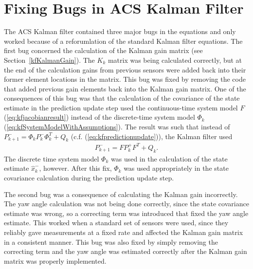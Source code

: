 \section{Fixing Bugs in ACS Kalman Filter}%
\label{sec:kfBugs}
The ACS Kalman filter contained three major bugs in the equations and only worked because of a reforumlation of the standard Kalman filter equations.
The first bug concerned the calculation of the Kalman gain matrix (see Section~\ref{kfKalmanGain}).
The $K_k$ matrix was being calculated correctly, but at the end of the calculation gains from previous sensors were added back into their former element locations in the matrix.
This bug was fixed by removing the code that added previous gain elements back into the Kalman gain matrix.
One of the consequences of this bug was that the calculation of the covariance of the state estimate in the prediction update step used the continuous-time system model $F$ (\ref{eq:kfjacobianresult}) instead of the discrete-time system model $\Phi_k$ (\ref{eq:kfSystemModelWithAssumptions}).
The result was such that instead of $P_{k+1}^- = \Phi_k P_k^-\Phi_k^T + Q_k$ (c.f. (\ref{eq:kfpredictionupdate})), the Kalman filter used
\begin{align*}
P_{k+1}^- = FP_k^+F^T + Q_k.
\end{align*}
The discrete time system model $\Phi_k$ was used in the calculation of the state estimate $\hat{x}_k^-$, however.
After this fix, $\Phi_k$ was used appropriately in the state covariance calculation during the prediction update step.

The second bug was a consequence of calculating the Kalman gain incorrectly.
The yaw angle calculation was not being done correctly, since the state covariance estimate was wrong, so a correcting term was introduced that fixed the yaw angle estimate.
This worked when a standard set of sensors were used, since they reliably gave measurements at a fixed rate and affected the Kalman gain matrix in a consistent manner.
This bug was also fixed by simply removing the correcting term and the yaw angle was estimated correctly after the Kalman gain matrix was properly implemented.

